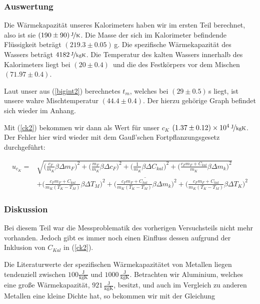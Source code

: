\documentclass[11pt,a4paper]{article}
\begin{document}
\subsubsection{Auswertung}

Die W\"armekapazit\"at unseres Kalorimeters haben wir im ersten Teil berechnet, also ist sie $(190\pm90)\,\nicefrac{\mathrm{J}}{\mathrm{K}}$. Die Masse der sich im Kalorimeter befindende Fl\"ussigkeit betr\"agt $(219.3\pm0.05)$\,g. Die spezifische W\"armekapazit\"at des Wassers betr\"agt $4182\,\nicefrac{\mathrm{J}}{\mathrm{kgK}}$. Die Temperatur des kalten Wassers innerhalb des Kalorimeters liegt bei $(20\pm0.4)$\celsius\ und die des Festk\"orpers vor dem Mischen $(71.97\pm0.4)$\celsius.

Laut unser aus (\ref{bigint2}) berechnetes $t_m$, welches bei $(29\pm0.5)$\,s liegt, ist unsere wahre Mischtemperatur $(44.4\pm0.4)$\celsius. Der hierzu geh\"orige Graph befindet sich wieder im Anhang.

Mit (\ref{ck2}) bekommen wir dann als Wert f\"ur unser $c_K$ $(1.37\pm0.12)\times10^4\,\nicefrac{\mathrm{J}}{\mathrm{kgK}}$. Der Fehler hier wird wieder mit dem Gau\ss 'schen Fortpflanzungsgesetz durchgef\"uhrt:

\begin{align*}
 	u_{c_K} = &\sqrt{\bigg(\frac{c_F}{m_K} \beta \Delta m_F\bigg)^2 + \bigg( \frac{m_F}{m_K} \beta \Delta c_F\bigg)^2 + \bigg( \frac{1}{m_K} \beta \Delta C_{kal}\bigg)^2 + \bigg( \frac{c_F m_F + C_{kal}}{m_K} \beta \Delta m_k\bigg)^2}\\
 	& + \overline{\bigg( \frac{c_F m_F + C_{kal}}{m_K (T_K - T_M)} \beta \Delta T_M \bigg)^2 + \bigg( \frac{c_F m_F + C_{kal}}{m_K (T_K - T_M)} \beta \Delta m_k\bigg)^2 + \bigg( \frac{c_F m_F + C_{kal}}{m_K (T_K - T_M)} \beta \Delta T_K \bigg)^2}
\end{align*}

\subsubsection{Diskussion}

Bei diesem Teil war die Messproblematik des vorherigen Versuchsteils nicht mehr vorhanden. Jedoch gibt es immer noch einen Einfluss dessen aufgrund der Inklusion von $C_{Kal}$ in (\ref{ck2}).


Die Literaturwerte der spezifischen W\"armekapazit\"atet von Metallen liegen tendenziell zwischen $100\frac{\mathrm{J}}{\mathrm{kgK}}$ und $1000\,\frac{\mathrm{J}}{\mathrm{kgK}}$. Betrachten wir Aluminium, welches eine gro\ss e W\"armekapazit\"at, $921\,\frac{\mathrm{J}}{\mathrm{kgK}}$, besitzt, und auch im Vergleich zu anderen Metallen eine kleine Dichte hat, so bekommen wir mit der Gleichung
\end{document}
